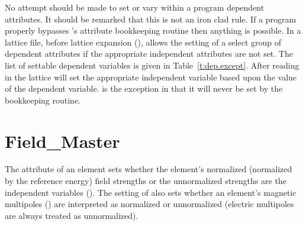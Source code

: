 No attempt should be made to set or vary within a program dependent attributes. It should be
remarked that this is not an iron clad rule.  If a program properly bypasses \bmad's attribute
bookkeeping routine then anything is possible. In a lattice file, before lattice expansion
(), \bmad allows the setting of a select group of dependent attributes if the
appropriate independent attributes are not set. The list of settable dependent variables is given in
Table~\ref{t:dep.except}.  After reading in the lattice \bmad will set the appropriate independent
variable based upon the value of the dependent variable.  is the exception in that it
will never be set by the bookkeeping routine.
\begin{table}[ht]
\caption {Dependent variables that can be set in a primary lattice file.}
\label{t:dep.except}
\end{table}

\section{Field_Master}
\label{s:field.master}

The  attribute of an element sets whether the element's normalized (normalized by
the reference energy) field strengths or the unnormalized strengths are the independent variables
().  The setting of  also sets whether an element's magnetic
multipoles () are interpreted as normalized or unnormalized (electric multipoles are
always treated as unnormalized).

